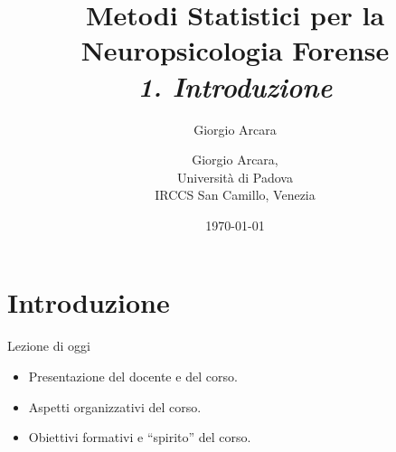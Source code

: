 \documentclass[
  ignorenonframetext,
]{beamer}
\author{Giorgio Arcara}
\date{}
\providecommand{\tightlist}{%
  \setlength{\itemsep}{0pt}\setlength{\parskip}{0pt}}
\begin{document}
\begin{frame}
\title{Metodi Statistici per la Neuropsicologia Forense\\ \vspace{1em} \emph{1. Introduzione}}
\author{Giorgio Arcara,\\ Università di Padova \\ IRCCS San Camillo, Venezia}

\date{\today}
\maketitle
\end{frame}

\section{Introduzione}\label{introduzione}

\begin{frame}{Lezione di oggi}
\label{lezione-di-oggi}
\begin{itemize}
\tightlist
\item
  Presentazione del docente e del corso.
\item
  Aspetti organizzativi del corso.
\item
  Obiettivi formativi e ``spirito'' del corso.
\end{itemize}
\end{frame}
\end{document}
